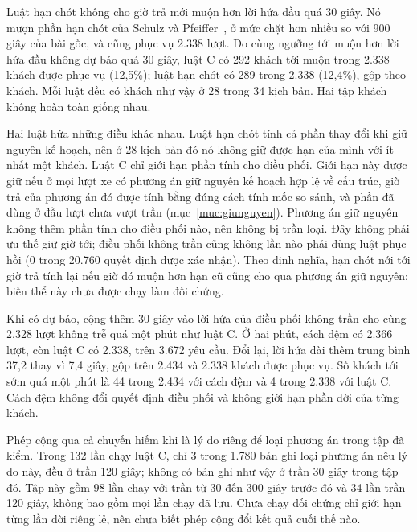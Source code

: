 Luật hạn chót không cho giờ trả mới muộn hơn lời hứa đầu quá 30 giây. Nó mượn phần hạn chót của Schulz và
Pfeiffer~\cite{schulz2026}, ở mức chặt hơn nhiều so với 900 giây của bài gốc, và cũng phục vụ 2.338 lượt.
Đo cùng ngưỡng tới muộn hơn lời hứa đầu không dự báo quá 30 giây, luật C có 292 khách tới muộn trong 2.338 khách được phục vụ
(12,5\%); luật hạn chót có 289 trong 2.338 (12,4\%), gộp theo khách. Mỗi luật đều có khách như vậy
ở 28 trong 34 kịch bản. Hai tập khách không hoàn toàn giống nhau.

Hai luật hứa những điều khác nhau. Luật hạn chót tính cả phần thay đổi khi giữ nguyên kế hoạch, nên ở
28 kịch bản đó nó không giữ được hạn của mình với ít nhất một khách. Luật C chỉ giới hạn phần tính cho
điều phối. Giới hạn này được giữ nếu ở mọi lượt xe có phương án giữ nguyên kế hoạch hợp lệ về cấu trúc, giờ trả của phương án
đó được tính bằng đúng cách tính mốc so sánh, và phần đã dùng ở đầu lượt chưa vượt trần
(mục~\ref{muc:giunguyen}). Phương án giữ nguyên không thêm phần tính cho điều phối nào, nên không bị
trần loại. Đây không phải ưu thế giữ giờ tới; điều phối không trần cũng không lần nào phải dùng luật phục hồi
(0 trong 20.760 quyết định được xác nhận). Theo định nghĩa, hạn chót nới tới giờ trả tính lại nếu giờ đó muộn hơn hạn cũ cũng cho qua phương án
giữ nguyên; biến thể này chưa được chạy làm đối chứng.

Khi có dự báo, cộng thêm 30 giây vào lời hứa của điều phối không trần cho cùng 2.328 lượt không trễ quá
một phút như luật C. Ở hai phút, cách đệm có 2.366 lượt, còn luật C có 2.338, trên 3.672 yêu cầu.
Đổi lại, lời hứa dài thêm trung bình 37,2 thay vì 7,4 giây, gộp trên 2.434 và 2.338 khách được phục vụ.
Số khách tới sớm quá một phút là 44 trong 2.434 với cách đệm và 4 trong 2.338 với luật C.
Cách đệm không đổi quyết định điều phối và không giới hạn phần dời của từng khách.

Phép cộng qua cả chuyến hiếm khi là lý do riêng để loại phương án trong tập đã kiểm. Trong 132 lần chạy
luật C, chỉ 3 trong 1.780 bản ghi loại phương án nêu lý do này, đều ở trần 120 giây; không có bản ghi
như vậy ở trần 30 giây trong tập đó. Tập này gồm 98 lần chạy với trần từ 30 đến 300 giây trước đó và 34 lần trần 120 giây, không
bao gồm mọi lần chạy đã lưu. Chưa chạy đối chứng chỉ giới hạn từng lần dời riêng lẻ, nên chưa biết
phép cộng đổi kết quả cuối thế nào.

